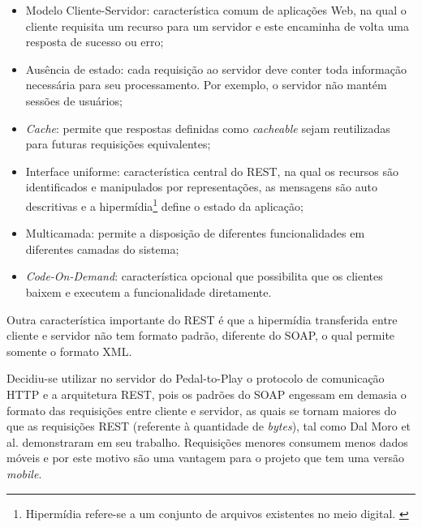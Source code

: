 \begin{itemize}
\item Modelo Cliente-Servidor: característica comum de aplicações Web, na qual o cliente requisita um recurso para um servidor e este encaminha de volta uma resposta de sucesso ou erro;

\item Ausência de estado: cada requisição ao servidor deve conter toda informação necessária para seu processamento. Por exemplo, o servidor não mantém sessões de usuários;

\item \textit{Cache}: permite que respostas definidas como \textit{cacheable} sejam reutilizadas para futuras requisições equivalentes; 

\item Interface uniforme: característica central do REST, na qual os recursos são identificados e manipulados por representações, as mensagens são auto descritivas e a hipermídia\footnote{Hipermídia refere-se a um conjunto de arquivos existentes no meio digital. \cite{dictionary2011hypermedia}} define o estado da aplicação;

\item Multicamada: permite a disposição de diferentes funcionalidades em diferentes camadas do sistema; 

\item \textit{Code-On-Demand}: característica opcional que possibilita que os clientes baixem e executem a funcionalidade diretamente. 
\end{itemize}

Outra característica importante do REST é que a hipermídia transferida entre cliente e servidor não tem formato padrão, diferente do SOAP, o qual permite somente o formato XML.

\par 
Decidiu-se utilizar no servidor do Pedal-to-Play o protocolo de comunicação HTTP e a arquitetura REST, pois os padrões do SOAP engessam em demasia o formato das requisições entre cliente e servidor, as quais se tornam maiores do que as requisições REST (referente à quantidade de \textit{bytes}), tal como Dal Moro et al. \citeyearpar{dal2009web} demonstraram em seu trabalho. Requisições menores consumem menos dados móveis e por este motivo são uma vantagem para o projeto que tem uma versão \textit{mobile}.

